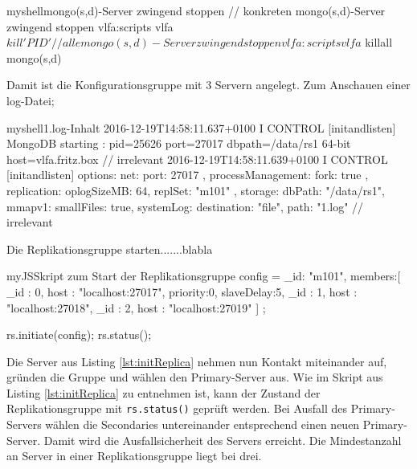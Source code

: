 \begin{listingsboxShell}[label={lst:killPID}]{myshell}{mongo(s,d)-Server zwingend stoppen}
// konkreten mongo(s,d)-Server zwingend stoppen
vlfa:scripts vlfa$ kill 'PID'

// alle mongo(s,d)-Server zwingend stoppen
vlfa:scripts vlfa$ killall mongo(s,d)
\end{listingsboxShell}

Damit ist die Konfigurationsgruppe mit 3 Servern angelegt. Zum Anschauen einer log-Datei;

\begin{listingsboxShell}[label={lst:X}]{myshell}{1.log-Inhalt}
2016-12-19T14:58:11.637+0100 I CONTROL  [initandlisten] MongoDB starting :
pid=25626 port=27017 dbpath=/data/rs1 64-bit host=vlfa.fritz.box
// irrelevant
2016-12-19T14:58:11.639+0100 I CONTROL  [initandlisten] options:
{ net: { port: 27017 }, processManagement: { fork: true }, replication:
{ oplogSizeMB: 64, replSet: "m101" }, storage: { dbPath: "/data/rs1",
mmapv1: {smallFiles: true}}, systemLog: {destination: "file", path: "1.log"}}
// irrelevant
\end{listingsboxShell}
Die Replikationsgruppe starten.......blabla
\begin{listingsboxJavaScript}[label={lst:initReplica}]{myJS}{Skript zum Start der Replikationsgruppe}
config = { _id: "m101", members:[
          { _id : 0, host : "localhost:27017", priority:0, slaveDelay:5},
          { _id : 1, host : "localhost:27018"},
          { _id : 2, host : "localhost:27019"} ]
};

rs.initiate(config);
rs.status();
\end{listingsboxJavaScript}

Die Server aus Listing \ref{lst:initReplica} nehmen nun Kontakt miteinander auf, gründen die Gruppe und wählen den Primary-Server aus. Wie im Skript aus Listing 	\ref{lst:initReplica} zu entnehmen ist, kann der Zustand der Replikationsgruppe mit \texttt{rs.status()} geprüft werden. Bei Ausfall des Primary-Servers wählen die Secondaries untereinander entsprechend einen neuen Primary-Server. Damit wird die Ausfallsicherheit des Servers erreicht. Die Mindestanzahl an Server in einer Replikationsgruppe liegt bei drei. 


